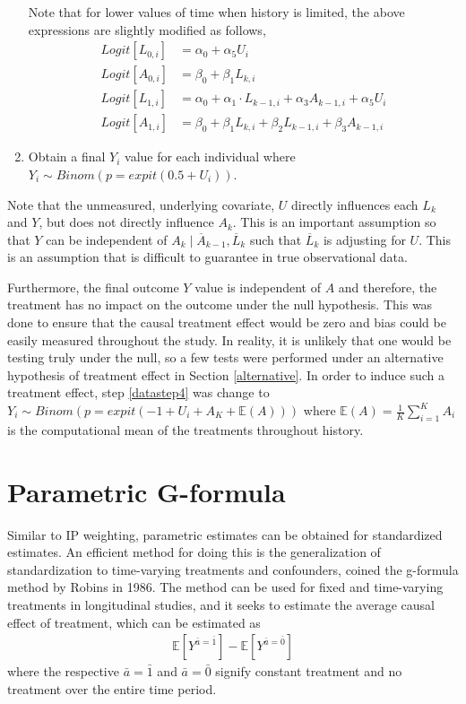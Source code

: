 \begin{enumerate}
Note that for lower values of time when history is limited, the above expressions are slightly modified as follows, 
\begin{align} 
Logit[L_{0,i}] &= \alpha_0 + \alpha_5 U_i\\ 
Logit[A_{0,i}] &= \beta_0 + \beta_1 L_{k,i} \\
Logit[L_{1,i}] &= \alpha_0 + \alpha_1 \cdot L_{k-1,i} + \alpha_3 A_{k-1,i}  + \alpha_5 U_i\\ 
Logit[A_{1,i}] &= \beta_0 + \beta_1 L_{k,i} + \beta_2 L_{k-1,i} + \beta_3 A_{k-1,i} 
\end{align} 
\item Obtain a final $Y_i$ value for each individual where $Y_i \sim Binom(p=expit(0.5+U_i))$.  \label{datastep4} 
\end{enumerate} 

Note that the unmeasured, underlying covariate, $U$ directly influences each $L_k$ and $Y$, but does not directly influence $A_k$.  This is an important assumption so that $Y$ can be independent of $A_k \mid \overline{A}_{k-1}, \overline{L}_k$ such that $\overline{L}_k$ is adjusting for $U$.  This is an assumption that is difficult to guarantee in true observational data.  

Furthermore, the final outcome $Y$ value is independent of $A$ and therefore, the treatment has no impact on the outcome under the null hypothesis.  This was done to ensure that the causal treatment effect would be zero and bias could be easily measured throughout the study.  In reality, it is unlikely that one would be testing truly under the null, so a few tests were performed under an alternative hypothesis of treatment effect in Section \ref{alternative}.  In order to induce such a treatment effect, step \ref{datastep4} was change to $Y_i \sim Binom(p = expit(-1+U_i + A_K + \mathbb{E}(A)))$ where $\mathbb{E}(A) = \frac{1}{K} \sum_{i=1}^K A_i $ is the computational mean of the treatments throughout history.  

\section{Parametric G-formula} 
Similar to IP weighting, parametric estimates can be obtained for standardized estimates.  An efficient method for doing this is the generalization of standardization to time-varying treatments and confounders, coined the g-formula method by Robins in 1986.\cite{hernan_robins_2016, robins1986new, wright2015international}  The method can be used for fixed and time-varying treatments in longitudinal studies, and it seeks to estimate the average causal effect of treatment, which can be estimated as 
\begin{align} 
\mathbb{E}[Y^{\bar{a} = \bar{1}}] - \mathbb{E}[Y^{\bar{a} = \bar{0}}] 
\end{align} 
where the respective $\bar{a} = \bar{1}$ and $\bar{a} = \bar{0}$ signify constant treatment and no treatment over the entire time period.  

